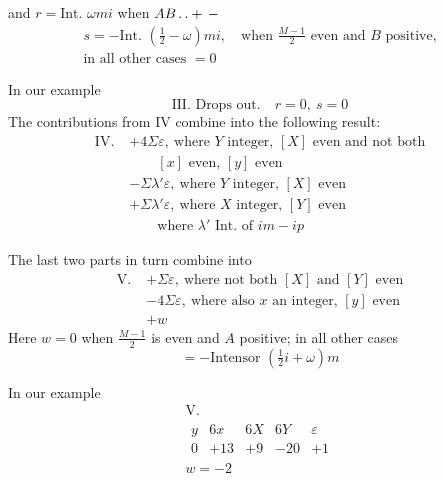 and $r=\text{Int. }\omega mi$ when $AB\mathinner{.\,.}+\,-$
\[
\begin{gathered}
s=-\text{Int. }(\tfrac12-\omega)mi,\quad\text{when }\frac{M-1}{2}\text{ even and }B\text{ positive,}\\
\text{in all other cases }=0
\end{gathered}
\]

In our example
\[
\text{III. Drops out.}\quad r=0,\ s=0
\]
The contributions from IV combine into the following result:
\[
\begin{aligned}
\mathrm{IV.}\;&+4\Sigma\varepsilon,\ \text{where }Y\text{ integer, }[X]\text{ even and not both}\\
&\qquad[x]\text{ even, }[y]\text{ even}\\
&-\Sigma\lambda'\varepsilon,\ \text{where }Y\text{ integer, }[X]\text{ even}\\
&+\Sigma\lambda'\varepsilon,\ \text{where }X\text{ integer, }[Y]\text{ even}\\
&\qquad\text{where }\lambda'\text{ Int. of }im-ip
\end{aligned}
\]

The last two parts in turn combine into
\[
\begin{aligned}
\mathrm{V.}\;&+\Sigma\varepsilon,\ \text{where not both }[X]\text{ and }[Y]\text{ even}\\
&-4\Sigma\varepsilon,\ \text{where also }x\text{ an integer, }[y]\text{ even}\\
&+w
\end{aligned}
\]
Here $w=0$ when $\frac{M-1}{2}$ is even and $A$ positive; in all other cases
\[
=-\text{Intensor }(\tfrac12i+\omega)m
\]

In our example
\[
\begin{gathered}
\mathrm{V.}\\
\begin{array}{c|r|r|r|r}
y&6x&6X&6Y&\varepsilon\\
0&+13&+9&-20&+1
\end{array}\\
w=-2
\end{gathered}
\]

